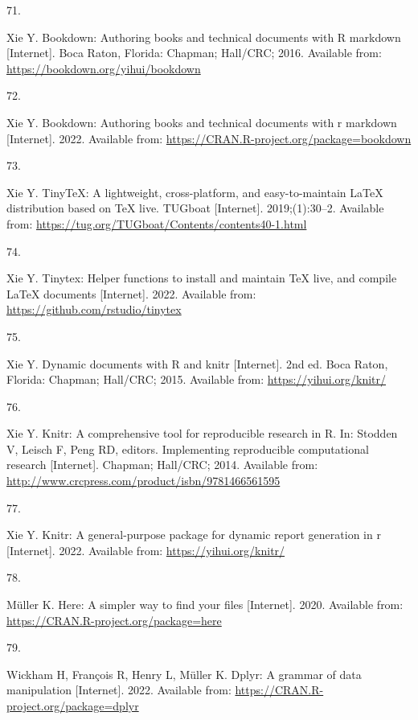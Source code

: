 \documentclass[10pt,a4paper]{article}
\newlength{\cslhangindent}
\newlength{\csllabelwidth}
\newlength{\cslentryspacingunit} %
\newenvironment{CSLReferences}[2] %
 {%
  \setlength{\parindent}{0pt}
  \ifodd #1
  \let\oldpar\par
  \def\par{\hangindent=\cslhangindent\oldpar}
  \fi
  \setlength{\parskip}{#2\cslentryspacingunit}
 }%
 {}
\newcommand{\CSLLeftMargin}[1]{\parbox[t]{\csllabelwidth}{#1}}
\newcommand{\CSLRightInline}[1]{\parbox[t]{\linewidth - \csllabelwidth}{#1}\break}
\begin{document}
\begin{CSLReferences}{0}{0}
\leavevmode{}%
\CSLLeftMargin{71. }
\CSLRightInline{Xie Y. Bookdown: Authoring books and technical documents with {R} markdown {[}Internet{]}. Boca Raton, Florida: Chapman; Hall/CRC; 2016. Available from: \url{https://bookdown.org/yihui/bookdown}}

\leavevmode{}%
\CSLLeftMargin{72. }
\CSLRightInline{Xie Y. Bookdown: Authoring books and technical documents with r markdown {[}Internet{]}. 2022. Available from: \url{https://CRAN.R-project.org/package=bookdown}}

\leavevmode{}%
\CSLLeftMargin{73. }
\CSLRightInline{Xie Y. TinyTeX: A lightweight, cross-platform, and easy-to-maintain LaTeX distribution based on TeX live. TUGboat {[}Internet{]}. 2019;(1):30--2. Available from: \url{https://tug.org/TUGboat/Contents/contents40-1.html}}

\leavevmode{}%
\CSLLeftMargin{74. }
\CSLRightInline{Xie Y. Tinytex: Helper functions to install and maintain TeX live, and compile LaTeX documents {[}Internet{]}. 2022. Available from: \url{https://github.com/rstudio/tinytex}}

\leavevmode{}%
\CSLLeftMargin{75. }
\CSLRightInline{Xie Y. Dynamic documents with {R} and knitr {[}Internet{]}. 2nd ed. Boca Raton, Florida: Chapman; Hall/CRC; 2015. Available from: \url{https://yihui.org/knitr/}}

\leavevmode{}%
\CSLLeftMargin{76. }
\CSLRightInline{Xie Y. Knitr: A comprehensive tool for reproducible research in {R}. In: Stodden V, Leisch F, Peng RD, editors. Implementing reproducible computational research {[}Internet{]}. Chapman; Hall/CRC; 2014. Available from: \url{http://www.crcpress.com/product/isbn/9781466561595}}

\leavevmode{}%
\CSLLeftMargin{77. }
\CSLRightInline{Xie Y. Knitr: A general-purpose package for dynamic report generation in r {[}Internet{]}. 2022. Available from: \url{https://yihui.org/knitr/}}

\leavevmode{}%
\CSLLeftMargin{78. }
\CSLRightInline{Müller K. Here: A simpler way to find your files {[}Internet{]}. 2020. Available from: \url{https://CRAN.R-project.org/package=here}}

\leavevmode{}%
\CSLLeftMargin{79. }
\CSLRightInline{Wickham H, François R, Henry L, Müller K. Dplyr: A grammar of data manipulation {[}Internet{]}. 2022. Available from: \url{https://CRAN.R-project.org/package=dplyr}}


\end{CSLReferences}
\end{document}

